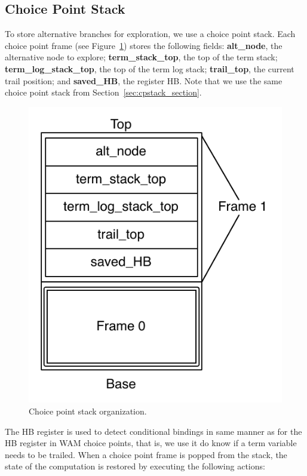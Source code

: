 \subsection{Choice Point Stack}

To store alternative branches for exploration, we use a choice point stack.
Each choice point frame
(see Figure~\ref{fig:choice_point_stack2})
stores the following fields:
\textbf{alt\_node}, the alternative node to explore;
\textbf{term\_stack\_top}, the top of the term stack;
\textbf{term\_log\_stack\_top}, the top of the term log stack;
\textbf{trail\_top}, the current trail position;
and \textbf{saved\_HB}, the register HB. Note that we use the same choice point stack
from Section~\ref{sec:cpstack_section}.

\begin{figure}[ht]
  \centering
    \includegraphics[scale=0.5]{choice_point_stack.pdf}
  \caption{Choice point stack organization.}
  \label{fig:choice_point_stack2}
\end{figure}

The HB register is used to detect conditional bindings in same manner as for the HB register in
WAM choice points, that is, we use it do know if a term variable needs to be trailed.
When a choice point frame is popped from the stack, the state of the computation is restored
by executing the following actions:

